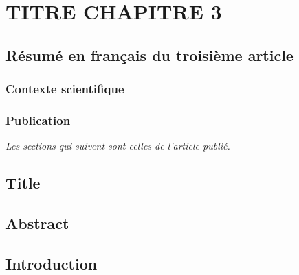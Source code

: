 \chapter{TITRE CHAPITRE 3}
\label{chap3}

\section{Résumé en français du troisième article}

\subsection{Contexte scientifique}

\subsection{Publication}


\emph{Les sections qui suivent sont celles de l'article publié.}


\section{Title}\label{title}


\section{Abstract}\label{abstract}


\section{Introduction}\label{introduction}
